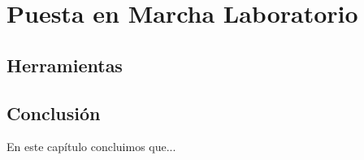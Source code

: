  \chapter{Puesta en Marcha Laboratorio}\label{cap:implementacion}

\section {Herramientas}

\section{Conclusión}
En este capítulo concluimos que...
